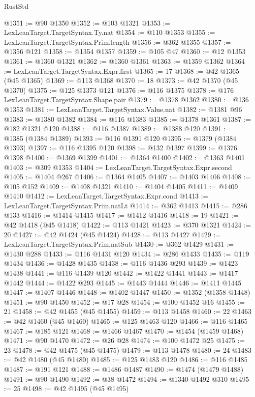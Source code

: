 \begin{lexlean}{RustStd}
\begin{coremodule}
@1351 := @90 @1350
@1352 := @103 @1321
@1353 := LexLeanTarget.TargetSyntax.Ty.nat
@1354 := @110 @1353
@1355 := LexLeanTarget.TargetSyntax.Prim.length
@1356 := @362 @1355
@1357 := @1356 @121
@1358 := @1354 @1357
@1359 := @105 @47
@1360 := @12 @1353
@1361 := @1360 @1321
@1362 := @1360 @1361
@1363 := @1359 @1362
@1364 := LexLeanTarget.TargetSyntax.Expr.first
@1365 := 17
@1368 := @42 @1365 (@45 @1365)
@1369 := @113 @1368
@1370 := 18
@1373 := @42 @1370 (@45 @1370)
@1375 := @125 @1373 @121
@1376 := @116 @1375
@1378 := @176 LexLeanTarget.TargetSyntax.Shape.pair
@1379 := @1378 @1362
@1380 := @136 @1353
@1381 := LexLeanTarget.TargetSyntax.Value.nat
@1382 := @1381 @96
@1383 := @1380 @1382
@1384 := @116 @1383
@1385 := @1378 @1361
@1387 := @182 @1321 @120
@1388 := @116 @1387
@1389 := @1388 @120
@1391 := @1385 (@1384 @1389)
@1393 := @116 @1391 @120
@1395 := @1379 (@1384 @1393)
@1397 := @116 @1395 @120
@1398 := @132 @1397
@1399 := @1376 @1398
@1400 := @1369 @1399
@1401 := @1364 @1400
@1402 := @1363 @1401
@1403 := @309 @1353
@1404 := LexLeanTarget.TargetSyntax.Expr.second
@1405 := @1404 @267
@1406 := @1364 @1405
@1407 := @1403 @1406
@1408 := @105 @152
@1409 := @1408 @1321
@1410 := @1404 @1405
@1411 := @1409 @1410
@1412 := LexLeanTarget.TargetSyntax.Expr.cond
@1413 := LexLeanTarget.TargetSyntax.Prim.natLt
@1414 := @362 @1413
@1415 := @286 @133
@1416 := @1414 @1415
@1417 := @1412 @1416
@1418 := 19
@1421 := @42 @1418 (@45 @1418)
@1422 := @113 @1421
@1423 := @370 @1321
@1424 := 20
@1427 := @42 @1424 (@45 @1424)
@1428 := @113 @1427
@1429 := LexLeanTarget.TargetSyntax.Prim.natSub
@1430 := @362 @1429
@1431 := @1430 @288
@1433 := @116 @1431 @120
@1434 := @286 @1433
@1435 := @119 @1434
@1436 := @1428 @1435
@1438 := @116 @1436 @293
@1439 := @1423 @1438
@1441 := @116 @1439 @120
@1442 := @1422 @1441
@1443 := @1417 @1442
@1444 := @1422 @293
@1445 := @1443 @1444
@1446 := @1411 @1445
@1447 := @1407 @1446
@1448 := @1402 @1447
@1450 := @1352 (@1358 @1448)
@1451 := @90 @1450
@1452 := @17 @28
@1454 := @100 @1452 @16
@1455 := 21
@1458 := @42 @1455 (@45 @1455)
@1459 := @113 @1458
@1460 := 22
@1463 := @42 @1460 (@45 @1460)
@1465 := @125 @1463 @120
@1466 := @116 @1465
@1467 := @185 @121
@1468 := @1466 @1467
@1470 := @1454 (@1459 @1468)
@1471 := @90 @1470
@1472 := @26 @28
@1474 := @100 @1472 @25
@1475 := 23
@1478 := @42 @1475 (@45 @1475)
@1479 := @113 @1478
@1480 := 24
@1483 := @42 @1480 (@45 @1480)
@1485 := @125 @1483 @120
@1486 := @116 @1485
@1487 := @191 @121
@1488 := @1486 @1487
@1490 := @1474 (@1479 @1488)
@1491 := @90 @1490
@1492 := @38 @1472
@1494 := @1340 @1492 @310
@1495 := 25
@1498 := @42 @1495 (@45 @1495)

\end{coremodule}
\end{lexlean}
